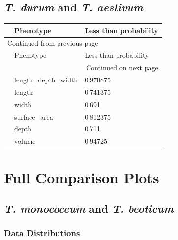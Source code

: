 \documentclass[11pt]{report}
\begin{document}
\section{\emph{T. durum} and \emph{T. aestivum}}
\label{sec:org7e0ed4a}
\begin{longtable}{l|l|l}
 & Phenotype & Less than probability\\
\hline
\endfirsthead
\multicolumn{3}{l}{Continued from previous page} \\
\hline

 & Phenotype & Less than probability \\

\hline
\endhead
\hline\multicolumn{3}{r}{Continued on next page} \\
\endfoot
\endlastfoot
\hline
 & length\_depth\_width & 0.970875\\
 & length & 0.741375\\
 & width & 0.691\\
 & surface\_area & 0.812375\\
 & depth & 0.711\\
 & volume & 0.94725\\
\end{longtable}


\chapter{Full Comparison Plots}
\label{sec:orgd5d9f53}

\section{\emph{T. monococcum} and \emph{T. beoticum}}
\label{sec:org69b0edc}
\subsection{Data Distributions}
\label{sec:orgc02127b}
\end{document}
